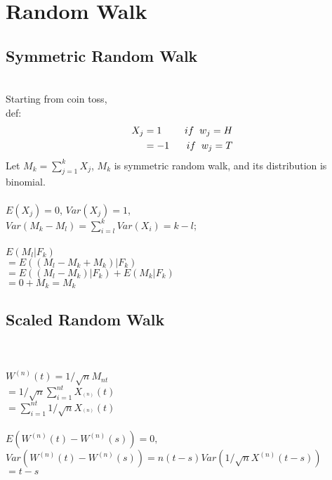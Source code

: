 \documentclass[a4paper]{article}
\begin{document}
\section{Random Walk}
\subsection{Symmetric Random Walk}
\\
Starting from coin toss, \\
def:
\begin{align*}
X_j & =  1 \hspace{2mm} &if \hspace{2mm} w_j = H\\
    & = -1 \hspace{2mm} &if \hspace{2mm} w_j = T	
\end{align*}
Let $M_k = \sum_{j=1} ^{k} X_j$, $M_k$ is symmetric random walk, and its distribution is binomial.\\

\\
$E(X_j) =0$, $Var(X_j) =1$,\\
$Var(M_k - M_l) = \sum_{i=l}^{k} Var(X_i) = k - l$;\\

 \\
$E(M_l| F_k)$\\
$=E((M_l - M_k + M_k) | F_k)$\\
$=E((M_l - M_k) | F_k) + E(M_k | F_k)$\\
$=0 + M_k = M_k$\\

\subsection{Scaled Random Walk}\\

\\
$W^{(n)}(t) = 1/\sqrt{n} M_{nt} $ \\
$= 1/\sqrt{n} \sum_{i=1} ^{nt} X_^{(n)}(t)$\\
$= \sum_{i=1} ^{nt}  1/\sqrt{n} X_^{(n)}(t)$ \\

\\
$E(W^{(n)}(t) - W^{(n)}(s)) =0, $\\
$Var(W^{(n)}(t) - W^{(n)}(s)) = n(t-s) Var(1/\sqrt{n} X^{(n)} (t-s) )$\\
$=t - s$ \\
\end{document}
